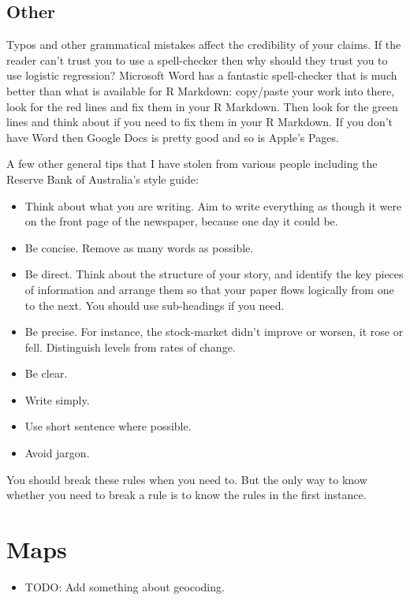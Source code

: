 \documentclass[
]{book}
\providecommand{\tightlist}{%
  \setlength{\itemsep}{0pt}\setlength{\parskip}{0pt}}
\begin{document}
\hypertarget{other-1}{%
\section{Other}\label{other-1}}

Typos and other grammatical mistakes affect the credibility of your claims. If the reader can't trust you to use a spell-checker then why should they trust you to use logistic regression? Microsoft Word has a fantastic spell-checker that is much better than what is available for R Markdown: copy/paste your work into there, look for the red lines and fix them in your R Markdown. Then look for the green lines and think about if you need to fix them in your R Markdown. If you don't have Word then Google Docs is pretty good and so is Apple's Pages.

A few other general tips that I have stolen from various people including the Reserve Bank of Australia's style guide:

\begin{itemize}
\tightlist
\item
  Think about what you are writing. Aim to write everything as though it were on the front page of the newspaper, because one day it could be.
\item
  Be concise. Remove as many words as possible.
\item
  Be direct. Think about the structure of your story, and identify the key pieces of information and arrange them so that your paper flows logically from one to the next. You should use sub-headings if you need.
\item
  Be precise. For instance, the stock-market didn't improve or worsen, it rose or fell. Distinguish levels from rates of change.
\item
  Be clear.
\item
  Write simply.
\item
  Use short sentence where possible.
\item
  Avoid jargon.
\end{itemize}

You should break these rules when you need to. But the only way to know whether you need to break a rule is to know the rules in the first instance.

\hypertarget{maps}{%
\chapter{Maps}\label{maps}}

\begin{itemize}
\tightlist
\item
  TODO: Add something about geocoding.
\end{itemize}
\end{document}
